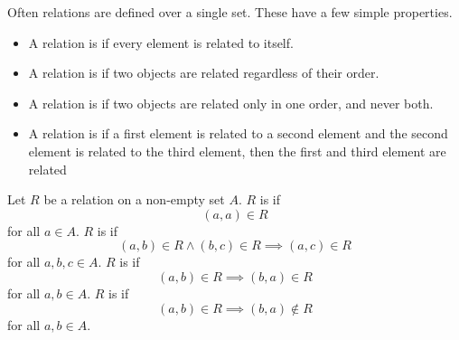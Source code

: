 
\sbasic




\sstart



Often relations
are defined over a single
set.
These have a few simple
properties.


\begin{itemize}

\item
A relation is
if every element
is related to itself.

\item
A relation is
if two objects are related
regardless of their order.

\item
A relation is
if two objects are related only in
one order, and never both.

\item
A relation is
if a first element is
related to a second element
and the second element
is related to the third element,
then the first and third
element are related
\end{itemize}


Let $R$ be a relation on
a non-empty set $A$.
$R$ is  if
$$(a, a) \in R$$
for all $a \in A$.
$R$ is  if
$$(a, b) \in R \land (b, c) \in R \implies (a, c) \in R$$
for all $a, b, c \in A$.
$R$ is  if
$$(a, b) \in R \implies (b, a) \in R$$
for all $a, b \in A$.
$R$ is  if
$$(a, b) \in R \implies (b, a) \not\in R$$
for all $a, b \in A$.

\strats
